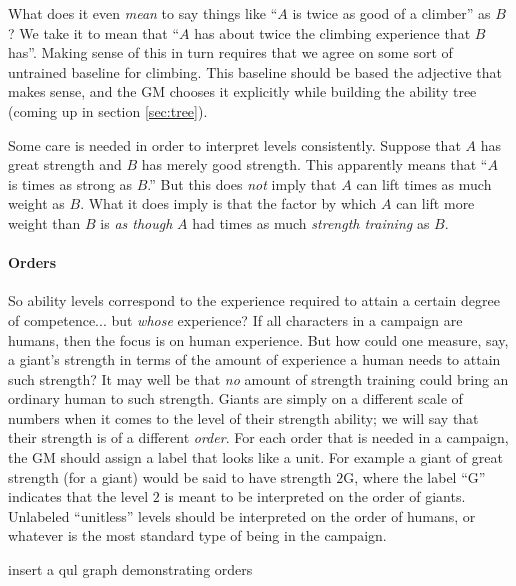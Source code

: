 \documentclass[12pt]{article}
\newcommand{\notes}[1]{{\color{Tan} #1}}
\newcommand{\emdex}[1]{\emph{#1}\index{#1}}
\begin{document}
What does it even \emph{mean} to say things like ``$A$ is twice as good of a climber'' as $B$?
We take it to mean that ``$A$ has about twice the climbing experience that $B$ has''.
Making sense of this in turn requires that we agree on some sort of untrained baseline for climbing.
This baseline should be based the adjective that makes sense, and the GM chooses it
explicitly while building the ability tree (coming up in section \ref{sec:tree}).

Some care is needed in order to interpret levels consistently.
Suppose that $A$ has great strength and $B$ has merely good strength.
This apparently means that ``$A$ is  times as strong as $B$.''
But this does \emph{not} imply that $A$ can lift  times as much weight as $B$.
What it does imply is that the factor by which $A$ can lift more weight than $B$ is
\emph{as though} $A$ had  times as much \emph{strength training} as $B$.

\paragraph{Orders}
So ability levels correspond to the experience required to attain a certain degree of competence... but \emph{whose} experience?
If all characters in a campaign are humans, then the focus is on human experience.
But how could one measure, say, a giant's strength in terms of the amount of experience a human needs to attain such strength?
It may well be that \emph{no} amount of strength training could bring an ordinary human to such strength.
Giants are simply on a different scale of numbers when it comes to the level of their strength ability;
we will say that their strength is of a different \emdex{order}.
For each order that is needed in a campaign, the GM should assign a label that looks like a unit.
For example a giant of great strength (for a giant) would be said to have strength $2$G,
where the label ``G'' indicates that the level $2$ is meant to be interpreted on the order of giants.
Unlabeled ``unitless'' levels should be interpreted on the order of humans, or whatever is the
most standard type of being in the campaign.

\notes{insert a qul graph demonstrating orders}
\end{document}
